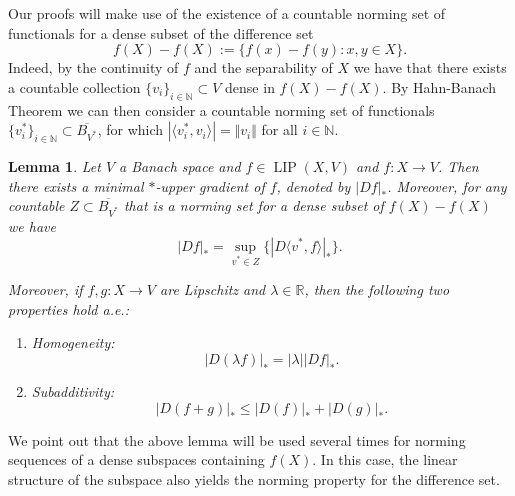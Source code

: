 \documentclass{amsart}
\newtheorem{lemma}[theorem]{Lemma}
\numberwithin{equation}{section}
\newcommand{\R}{\mathbb{R}}
\newcommand{\N}{\mathbb{N}}
\newcommand{\LIP}{\operatorname{LIP}}
\begin{document}
Our proofs will make use of the existence of a countable norming set of functionals for a dense subset of the difference set 
    $$f(X)-f(X):=\{ f(x)-f(y):x,y\in X\}.$$
    Indeed, by the continuity of $f$ and the separability of $X$ we have that there exists a countable collection $\{ v_i\}_{i\in\N}\subset V$ dense in $f(X)-f(X)$. 
    By Hahn-Banach Theorem we can then consider a countable norming set of functionals $\{ v_i^*\}_{i\in\N}\subset \overline{B_{V^*}}$, for which $|\langle v_i^*,v_i\rangle|=\Vert v_i\Vert$ for all $i\in\N$. 
\begin{lemma}\label{lem:ugscalarized}
    Let $V$ a Banach space and $f\in \LIP (X,V)$ and $f:X\rightarrow V$. Then there exists a minimal $*$-upper gradient of $f$, denoted by $|Df|_*$. Moreover, for any countable $Z\subset \overline{B_{V^*}}$ that is a norming set for a dense subset of $f(X)-f(X)$ we have
    \[
    |Df|_*=\sup_{v^*\in Z}\{ |D\langle v^*,f\rangle |_*\}.
    \]

    Moreover, if $f,g:X\to V$ are Lipschitz and $\lambda\in \R$, then the following two properties hold a.e.:
    \begin{enumerate}
        \item Homogeneity:
        \[
        |D(\lambda f)|_* = |\lambda| |Df|_*.
        \]
        \item Subadditivity: 
        \[
        |D(f+g)|_* \leq |D(f)|_* + |D(g)|_*.
        \]
    \end{enumerate}
\end{lemma}
    We point out that the above lemma will be used several times for norming sequences of a dense subspaces containing $f(X)$. In this case, the linear structure of the subspace also yields the norming property for the difference set.
\end{document}
